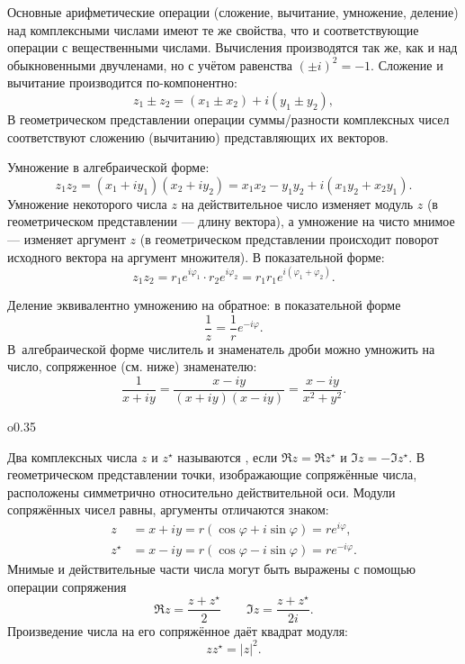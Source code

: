 \begin{labsupplement}
    Основные арифметические операции (сложение, вычитание, умножение, деление)
    над комплексными числами имеют те же свойства, что и соответствующие операции с вещественными числами.
    Вычисления производятся так же, как и над обыкновенными двучленами,
    но с учётом равенства $(\pm i)^{2} = - 1$.
    Сложение и вычитание производится по-компонентно:
    \[
     z_1 \pm z_2 = (x_1 \pm x_2) + i (y_1 \pm y_2),
    \]
    В геометрическом представлении операции суммы/разности комплексных чисел соответствуют
    сложению (вычитанию) представляющих их векторов.

    Умножение в алгебраической форме:
    \[
     z_1 z_2 = (x_1 +iy_1)(x_2 + iy_2) = x_1 x_2 - y_1 y_2 + i(x_1y_2 + x_2 y_1).
    \]
    Умножение некоторого числа $z$ на действительное число изменяет модуль
    $z$ (в геометрическом представлении --- длину вектора), а умножение
    на чисто мнимое --- изменяет аргумент $z$ (в геометрическом представлении
    происходит поворот исходного вектора на аргумент множителя). В показательной форме:
    \[
     z_1 z_2 = r_1 e^{i\varphi_1} \cdot r_2 e^{i\varphi_2} = r_1r_1 e^{i(\varphi_1+\varphi_2)}.
    \]


    Деление эквивалентно умножению на обратное: в показательной
    форме
    \[
      \frac{1}{z} = \frac{1}{r} e^{-i\varphi}.
    \]
 В~алгебраической форме числитель и знаменатель дроби можно умножить на число,
 сопряженное (см. ниже) знаменателю:
    \[
     \frac{1}{x+iy} = \frac{x-iy}{(x+iy)(x-iy)}=\frac{x-iy}{x^2+y^2}.
    \]

    \begin{wrapfigure}[9]{o}{0.35\textwidth}
    \end{wrapfigure}

    Два комплексных числа $z$ и $z^{\star}$ называются
    , если
    $\Re z = \Re z^{\star}$ и $\Im z = - \Im z^{\star}$. В геометрическом
    представлении точки, изображающие сопряжённые числа, расположены симметрично
    относительно действительной оси. Модули сопряжённых чисел
    равны, аргументы отличаются знаком:
    \begin{equation*}
    \begin{aligned}
        z &= x + iy = r(\cos\varphi + i\sin\varphi) = re^{i\varphi}, \\
        z^{\star} &= x - iy = r(\cos\varphi - i\sin\varphi) = re^{- i\varphi}.
    \end{aligned}
    \end{equation*}
    Мнимые и действительные части числа могут быть выражены с помощью
    операции сопряжения
    \[
     \Re z = \frac{z+z^{\star}}{2}\qquad \Im z =\frac{z+z^{\star}}{2i}.
    \]
    Произведение числа на его сопряжённое даёт квадрат модуля:
    \[
     z z^{\star} = |z|^2.
    \]


\end{labsupplement}
